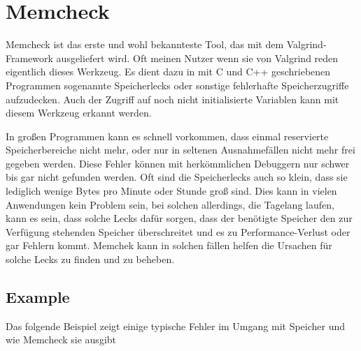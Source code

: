 \section{Memcheck}
Memcheck ist das erste und wohl bekannteste Tool, das mit dem Valgrind-Framework ausgeliefert wird. Oft meinen Nutzer wenn sie von Valgrind reden eigentlich dieses Werkzeug. Es dient dazu in mit C und C++ geschriebenen Programmen sogenannte Speicherlecks oder sonstige fehlerhafte Speicherzugriffe aufzudecken. Auch der Zugriff auf noch nicht initialisierte Variablen kann mit diesem Werkzeug erkannt werden.

In großen Programmen kann es schnell vorkommen, dass einmal reservierte Speicherbereiche nicht mehr, oder nur in seltenen Ausnahmefällen nicht mehr frei gegeben werden. Diese Fehler können mit herkömmlichen Debuggern nur schwer bis gar nicht gefunden werden. Oft sind die Speicherlecks auch so klein, dass sie lediglich wenige Bytes pro Minute oder Stunde groß sind. Dies kann in vielen Anwendungen kein Problem sein, bei solchen allerdings, die Tagelang laufen, kann es sein, dass solche Lecks dafür sorgen, dass der benötigte Speicher den zur Verfügung stehenden Speicher überschreitet und es zu Performance-Verlust oder gar Fehlern kommt. Memchek kann in solchen fällen helfen die Ursachen für solche Lecks zu finden und zu beheben.

\subsection{Example}
Das folgende Beispiel zeigt einige typische Fehler im Umgang mit Speicher und wie Memcheck sie ausgibt



